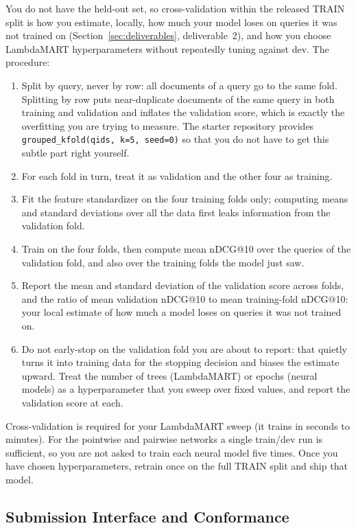 \documentclass[10pt]{article}
\begin{document}
You do not have the held-out set, so cross-validation within the released TRAIN split is how you estimate, locally, how much your model loses on queries it was not trained on (Section~\ref{sec:deliverables}, deliverable~2), and how you choose LambdaMART hyperparameters without repeatedly tuning against dev. The procedure:
\begin{enumerate}
  \item Split by query, never by row: all documents of a query go to the same fold. Splitting by row puts near-duplicate documents of the same query in both training and validation and inflates the validation score, which is exactly the overfitting you are trying to measure. The starter repository provides \texttt{grouped\_kfold(qids, k=5, seed=0)} so that you do not have to get this subtle part right yourself.
  \item For each fold in turn, treat it as validation and the other four as training.
  \item Fit the feature standardizer on the four training folds only; computing means and standard deviations over all the data first leaks information from the validation fold.
  \item Train on the four folds, then compute mean nDCG@10 over the queries of the validation fold, and also over the training folds the model just saw.
  \item Report the mean and standard deviation of the validation score across folds, and the ratio of mean validation nDCG@10 to mean training-fold nDCG@10: your local estimate of how much a model loses on queries it was not trained on.
  \item Do not early-stop on the validation fold you are about to report: that quietly turns it into training data for the stopping decision and biases the estimate upward. Treat the number of trees (LambdaMART) or epochs (neural models) as a hyperparameter that you sweep over fixed values, and report the validation score at each.
\end{enumerate}
Cross-validation is required for your LambdaMART sweep (it trains in seconds to minutes). For the pointwise and pairwise networks a single train/dev run is sufficient, so you are not asked to train each neural model five times. Once you have chosen hyperparameters, retrain once on the full TRAIN split and ship that model.

\subsection{Submission Interface and Conformance}
\label{sec:interface}
\end{document}
